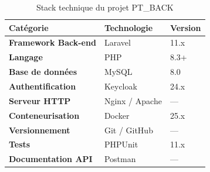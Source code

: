 \begin{table}[H]
\centering
\caption{Stack technique du projet PT\_BACK}
\begin{tabular}{|>{\bfseries}l|l|l|}
\hline
\rowcolor{emsiRed!15}
\textbf{Cat\'{e}gorie} & \textbf{Technologie} & \textbf{Version} \\
\hline
Framework Back-end  & Laravel         & 11.x \\
\hline
Langage             & PHP             & 8.3+ \\
\hline
Base de donn\'{e}es     & MySQL           & 8.0 \\
\hline
Authentification    & Keycloak        & 24.x \\
\hline
Serveur HTTP        & Nginx / Apache  & --- \\
\hline
Conteneurisation    & Docker          & 25.x \\
\hline
Versionnement       & Git / GitHub    & --- \\
\hline
Tests               & PHPUnit         & 11.x \\
\hline
Documentation API   & Postman         & --- \\
\hline
\end{tabular}
\end{table}
